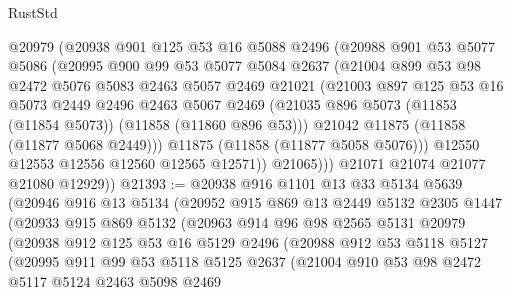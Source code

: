 \begin{lexlean}{RustStd}
\begin{coremodule}
            @20979
            (@20938
              @901
              @125
              @53
              @16
              @5088
              @2496
              (@20988
                @901
                @53
                @5077
                @5086
                (@20995
                  @900
                  @99
                  @53
                  @5077
                  @5084
                  @2637
                  (@21004
                    @899
                    @53
                    @98
                    @2472
                    @5076
                    @5083
                    @2463
                    @5057
                    @2469
                    @21021
                    (@21003
                      @897
                      @125
                      @53
                      @16
                      @5073
                      @2449
                      @2496
                      @2463
                      @5067
                      @2469
                      (@21035 @896 @5073 (@11853 (@11854 @5073)) (@11858 (@11860 @896 @53)))
                      @21042
                      @11875
                      (@11858 (@11877 @5068 @2449)))
                    @11875
                    (@11858 (@11877 @5058 @5076)))
                  @12550
                  @12553
                  @12556
                  @12560
                  @12565
                  @12571))
              @21065)))
        @21071
        @21074
        @21077
        @21080
        @12929))
@21393 := @20938
    @916
    @1101
    @13
    @33
    @5134
    @5639
    (@20946
      @916
      @13
      @5134
      (@20952
        @915
        @869
        @13
        @2449
        @5132
        @2305
        @1447
        (@20933
          @915
          @869
          @5132
          (@20963
            @914
            @96
            @98
            @2565
            @5131
            @20979
            (@20938
              @912
              @125
              @53
              @16
              @5129
              @2496
              (@20988
                @912
                @53
                @5118
                @5127
                (@20995
                  @911
                  @99
                  @53
                  @5118
                  @5125
                  @2637
                  (@21004
                    @910
                    @53
                    @98
                    @2472
                    @5117
                    @5124
                    @2463
                    @5098
                    @2469

\end{coremodule}
\end{lexlean}
